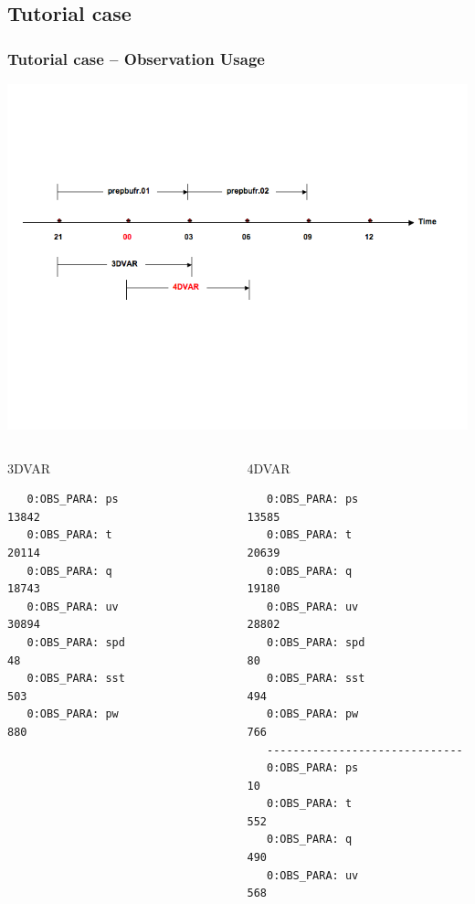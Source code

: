 \documentclass{beamer}
\begin{document}
\subsection{Tutorial case}

\begin{frame}[fragile]
\frametitle{Tutorial case -- Observation Usage}
\begin{center}
\includegraphics[scale=0.40, trim=25 200 50 150, clip]{obs_usage} 
\end{center}\pause
\begin{columns}[c]
\column{5cm}
\begin{beamerboxesrounded}[ lower=postit,shadow=true]{3DVAR}
{\tiny
\begin{verbatim}
   0:OBS_PARA: ps                       13842
   0:OBS_PARA: t                        20114
   0:OBS_PARA: q                        18743
   0:OBS_PARA: uv                       30894
   0:OBS_PARA: spd                         48
   0:OBS_PARA: sst                        503
   0:OBS_PARA: pw                         880
\end{verbatim}
}
\end{beamerboxesrounded}
\column{5cm}
\begin{beamerboxesrounded}[ lower=postit,shadow=true]{4DVAR}
{\tiny
\begin{verbatim}
   0:OBS_PARA: ps                       13585
   0:OBS_PARA: t                        20639
   0:OBS_PARA: q                        19180
   0:OBS_PARA: uv                       28802
   0:OBS_PARA: spd                         80
   0:OBS_PARA: sst                        494
   0:OBS_PARA: pw                         766
   ------------------------------
   0:OBS_PARA: ps                          10
   0:OBS_PARA: t                          552
   0:OBS_PARA: q                          490
   0:OBS_PARA: uv                         568
\end{verbatim}
}
\end{beamerboxesrounded}
\end{columns}
\end{frame}
\end{document}
